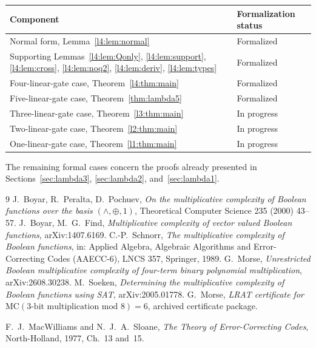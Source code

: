 \documentclass[11pt,a4paper]{article}
\theoremstyle{plain}
\theoremstyle{remark}
\begin{document}
\begin{center}
\begin{tabularx}{\textwidth}{@{}X l@{}}
\toprule
Component & Formalization status\\
\midrule
Normal form, Lemma~\ref{l4:lem:normal} & Formalized\\
Supporting Lemmas~\ref{l4:lem:Qonly}, \ref{l4:lem:support}, \ref{l4:lem:cross}, \ref{l4:lem:noq2}, \ref{l4:lem:deriv}, \ref{l4:lem:types} & Formalized\\
Four-linear-gate case, Theorem~\ref{l4:thm:main} & Formalized\\
Five-linear-gate case, Theorem~\ref{thm:lambda5} & Formalized\\
Three-linear-gate case, Theorem~\ref{l3:thm:main} & In progress\\
Two-linear-gate case, Theorem~\ref{l2:thm:main} & In progress\\
One-linear-gate case, Theorem~\ref{l1:thm:main} & In progress\\
\bottomrule
\end{tabularx}
\end{center}
The remaining formal cases concern the proofs already presented in Sections~\ref{sec:lambda3}, \ref{sec:lambda2}, and~\ref{sec:lambda1}.

\begin{thebibliography}{9}
 J.~Boyar, R.~Peralta, D.~Pochuev, \emph{On the multiplicative complexity of Boolean functions over the basis $(\wedge,\oplus,1)$}, Theoretical Computer Science 235 (2000) 43--57.
 J.~Boyar, M.~G.~Find, \emph{Multiplicative complexity of vector valued Boolean functions}, arXiv:1407.6169.
 C.-P.~Schnorr, \emph{The multiplicative complexity of Boolean functions}, in: Applied Algebra, Algebraic Algorithms and Error-Correcting Codes (AAECC-6), LNCS 357, Springer, 1989.
 G.~Morse, \emph{Unrestricted Boolean multiplicative complexity of four-term binary polynomial multiplication}, arXiv:2608.30238.
 M.~Soeken, \emph{Determining the multiplicative complexity of Boolean functions using SAT}, arXiv:2005.01778.
 G.~Morse, \emph{LRAT certificate for $\mathrm{MC}(3\text{-bit multiplication mod }8)=6$}, archived certificate package.

 F.~J.~MacWilliams and N.~J.~A.~Sloane, \emph{The Theory of Error-Correcting Codes}, North-Holland, 1977, Ch.~13 and~15.
\end{thebibliography}
\end{document}
